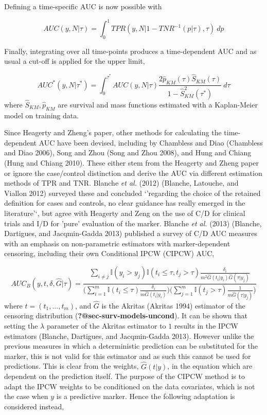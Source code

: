 \documentclass[
  letterpaper,
]{scrbook}
\theoremstyle{plain}
\theoremstyle{definition}
\theoremstyle{remark}
\begin{document}
Defining a time-specific AUC is now possible with

\[
AUC(y, N | \tau) = \int^1_0 TPR(y, N | 1 - TNR^{-1}(p|\tau), \tau) \ dp
\]

Finally, integrating over all time-points produces a time-dependent AUC
and as usual a cut-off is applied for the upper limit,

\[
AUC^*(y,N|\tau^*) = \int^{\tau^*}_0 AUC(y,N|\tau)\frac{2\hat{p}_{KM}(\tau)\hat{S}_{KM}(\tau)}{1 - \hat{S}_{KM}^2(\tau^*)} \ d\tau
\] where \(\hat{S}_{KM},\hat{p}_{KM}\) are survival and mass functions
estimated with a Kaplan-Meier model on training data.

Since Heagerty and Zheng's paper, other methods for calculating the
time-dependent AUC have been devised, including by Chambless and Diao
(Chambless and Diao 2006), Song and Zhou (Song and Zhou 2008), and Hung
and Chiang (Hung and Chiang 2010). These either stem from the Heagerty
and Zheng paper or ignore the case/control distinction and derive the
AUC via different estimation methods of TPR and TNR. Blanche
\textit{et al.} (2012) (Blanche, Latouche, and Viallon 2012) surveyed
these and concluded `'regarding the choice of the retained definition
for cases and controls, no clear guidance has really emerged in the
literature'`, but agree with Heagerty and Zeng on the use of C/D for
clinical trials and I/D for 'pure' evaluation of the marker. Blanche
\textit{et al.} (2013) (Blanche, Dartigues, and Jacqmin-Gadda 2013)
published a survey of C/D AUC measures with an emphasis on
non-parametric estimators with marker-dependent censoring, including
their own Conditional IPCW (CIPCW) AUC,

\[
AUC_B(y, t, \delta, \hat{G}|\tau) = \frac{\sum_{i \neq j} \mathbb{I}(y_i > y_j)\mathbb{I}(t_i \leq \tau, t_j > \tau)\frac{\delta_i}{m^2\hat{G}(t_i|y_i)\hat{G}(\tau|y_j)}}{\Big(\sum^m_{i=1}\mathbb{I}(t_i \leq \tau)\frac{\delta_i}{m\hat{G}(t_i|y_i)}\Big)\Big(\sum^m_{j=1}\mathbb{I}(t_j>\tau)\frac{1}{m\hat{G}(\tau|y_j)}\Big)}
\] where \(t = (t_1,...,t_m)\), and \(\hat{G}\) is the Akritas (Akritas
1994) estimator of the censoring distribution
(\textbf{?@sec-surv-models-uncond}). It can be shown that setting the
\(\lambda\) parameter of the Akritas estimator to \(1\) results in the
IPCW estimators (Blanche, Dartigues, and Jacqmin-Gadda 2013). However
unlike the previous measures in which a deterministic prediction can be
substituted for the marker, this is not valid for this estimator and as
such this cannot be used for predictions. This is clear from the
weights, \(\hat{G}(t|y)\), in the equation which are dependent on the
prediction itself. The purpose of the CIPCW method is to adapt the IPCW
weights to be conditioned on the data covariates, which is not the case
when \(y\) is a predictive marker. Hence the following adaptation is
considered instead,
\end{document}
